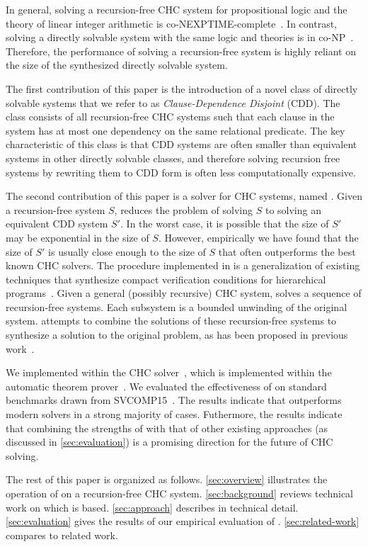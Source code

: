 In general, solving a recursion-free CHC system for
propositional logic and the theory of linear integer arithmetic is
co-NEXPTIME-complete~\cite{rummer13b}.
%
In contrast, solving a directly solvable system with the same logic
and theories is in co-NP~\cite{rummer13b}.
%
Therefore, the performance of solving a recursion-free system is
highly reliant on the size of the synthesized directly solvable
system.

The first contribution of this paper is the introduction of a novel
class of directly solvable systems that we refer to as
\emph{Clause-Dependence Disjoint} (CDD).
%
The class consists of all recursion-free CHC systems such that each
clause in the system has at most one dependency on the same relational
predicate.
%
The key characteristic of this class is that CDD systems are often
smaller than equivalent systems in other directly solvable classes,
and therefore solving recursion free systems by rewriting them to CDD
form is often less computationally expensive.

The second contribution of this paper is a solver for CHC systems,
named \sys.
%
Given a recursion-free system $S$, \sys reduces the problem
of solving $S$ to solving an equivalent CDD system
$S'$.
%
In the worst case, it is possible that the size of $S'$ may be
exponential in the size of $S$.
%
However, empirically we have found that the size of $S'$ is usually
close enough to the size of $S$ that \sys often outperforms the best
known CHC solvers.
%
The procedure implemented in \sys is a generalization of existing
techniques that synthesize compact verification conditions for
hierarchical programs~\cite{flanagan01,lal-qadeer15}.
%
Given a general (possibly recursive) CHC system, \sys solves a
sequence of recursion-free systems.
%
Each subsystem is a bounded unwinding of the original system. \sys
attempts to combine the solutions of these recursion-free systems to
synthesize a solution to the original problem, as has been proposed
in previous work~\cite{rummer13b}.

We implemented \sys within the \duality CHC solver~\cite{bjorner13},
which is implemented within the \zthree automatic theorem
prover~\cite{moura08}.
%
We evaluated the effectiveness of \sys on standard benchmarks drawn
from SVCOMP15~\cite{svcomp15}.
%
The results indicate that \sys outperforms modern solvers in a strong
majority of cases.
%
Futhermore, the results indicate that combining the strengths of \sys
with that of other existing approaches (as discussed in
\autoref{sec:evaluation}) is a promising direction for the future of
CHC solving.

The rest of this paper is organized as follows.
%
\autoref{sec:overview} illustrates the operation of \sys on a
recursion-free CHC system.
%
\autoref{sec:background} reviews technical work on which \sys is
based.
%
\autoref{sec:approach} describes \sys in technical detail.
%
\autoref{sec:evaluation} gives the results of our empirical evaluation
of \sys.
%
\autoref{sec:related-work} compares \sys to related work.
